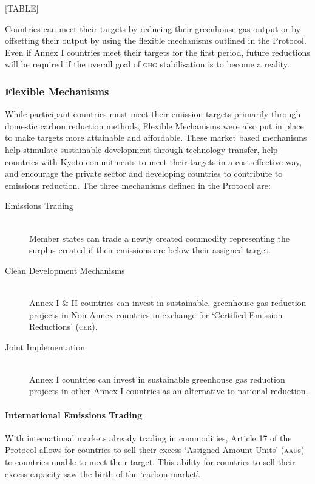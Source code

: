 [TABLE]

Countries can meet their targets by reducing their greenhouse gas output or by offsetting their output by using the flexible mechanisms outlined in the Protocol. Even if Annex I countries meet their targets for the first period, future reductions will be required if the overall goal of \textsc{ghg} stabilisation is to become a reality.

\subsubsection{Flexible Mechanisms}

While participant countries must meet their emission targets primarily through domestic carbon reduction methods, Flexible Mechanisms were also put in place to make targets more attainable and affordable. These market based mechanisms help stimulate sustainable development through technology transfer, help countries with Kyoto commitments to meet their targets in a cost-effective way, and encourage the private sector and developing countries to contribute to emissions reduction. The three mechanisms defined in the Protocol are:

\begin{description}
	\item[Emissions Trading] \hfill \\
	Member states can trade a newly created commodity representing the surplus created if their emissions are below their assigned target.
	
	\item[Clean Development Mechanisms] \hfill \\
	Annex I \& II countries can invest in sustainable, greenhouse gas reduction projects in Non-Annex countries in exchange for `Certified Emission Reductions' (\textsc{cer}).~\cite{UNFCCC-05}

	\item[Joint Implementation] \hfill \\
	Annex I countries can invest in sustainable greenhouse gas reduction projects in other Annex I countries as an alternative to national reduction.
\end{description}

\paragraph{International Emissions Trading}

With international markets already trading in commodities, Article 17 of the Protocol allows for countries to sell their excess `Assigned Amount Units' (\textsc{aau}s) to countries unable to meet their target. This ability for countries to sell their excess capacity saw the birth of the `carbon market'.

